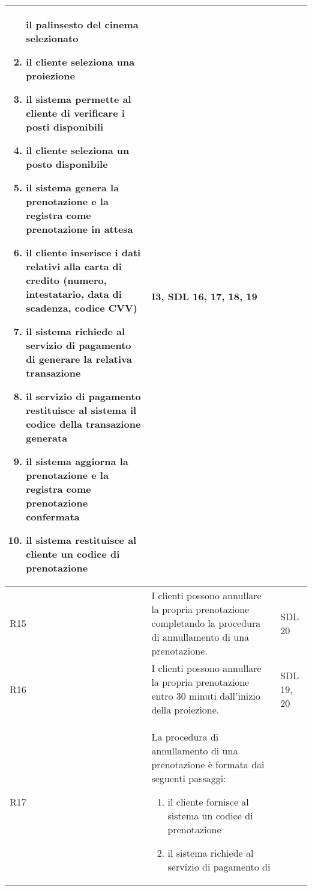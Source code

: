 \begin{longtable}{|p{0.8cm}|p{13.4cm}|p{2.1cm}|}
\begin{enumerate}
                  il palinsesto del cinema selezionato
            \item il cliente seleziona una proiezione
            \item il sistema permette al cliente di verificare
                  i posti disponibili
            \item il cliente seleziona un posto disponibile
            \item il sistema genera la prenotazione e la registra
                  come prenotazione in attesa
            \item il cliente inserisce i dati relativi alla carta
                  di credito (numero, intestatario, data di scadenza,
                  codice CVV)
            \item il sistema richiede al servizio di pagamento di
                  generare la relativa transazione
            \item il servizio di pagamento restituisce al sistema
                  il codice della transazione generata
            \item il sistema aggiorna la prenotazione e la registra
                  come prenotazione confermata
            \item il sistema restituisce al cliente un codice di
                  prenotazione
      \end{enumerate}                   &
      I3, SDL 16, 17, 18, 19
      \\\hline
      R15                                                                     &
      I clienti possono annullare la propria prenotazione completando la
      procedura di annullamento di una prenotazione.                          &
      SDL 20
      \\\hline
      R16                                                                     &
      I clienti possono annullare la propria prenotazione entro 30 minuti
      dall'inizio della proiezione.                                           &
      SDL 19, 20
      \\\hline
      R17                                                                     &
      La procedura di annullamento di una prenotazione è formata dai
      seguenti passaggi:
      \begin{enumerate}
            \item il cliente fornisce al sistema un codice di
                  prenotazione
            \item il sistema richiede al servizio di pagamento di

\end{enumerate}
\end{longtable}
